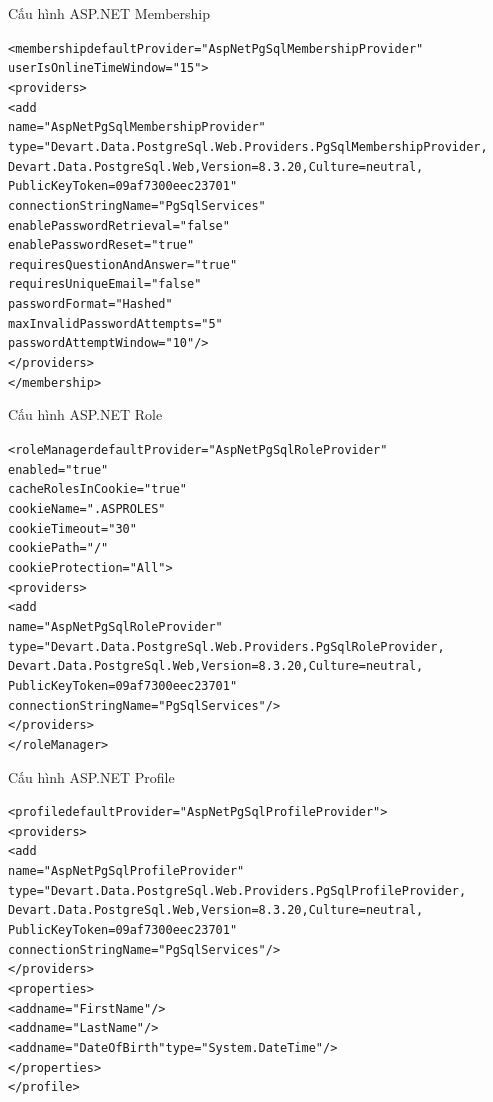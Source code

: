 \documentclass{article}[14pt]
\begin{document}
Cấu hình ASP.NET Membership
\begin{mdframed}[backgroundcolor=white, linecolor=black, roundcorner=5pt]
\begin{alltt}
<membership defaultProvider="AspNetPgSqlMembershipProvider"
            userIsOnlineTimeWindow="15">
  <providers>
    <add
      name="AspNetPgSqlMembershipProvider"
      type="Devart.Data.PostgreSql.Web.Providers.PgSqlMembershipProvider,
            Devart.Data.PostgreSql.Web, Version=8.3.20, Culture=neutral,
            PublicKeyToken=09af7300eec23701"
      connectionStringName="PgSqlServices"
      enablePasswordRetrieval="false"
      enablePasswordReset="true"
      requiresQuestionAndAnswer="true"
      requiresUniqueEmail="false"
      passwordFormat="Hashed"
      maxInvalidPasswordAttempts="5"
      passwordAttemptWindow="10" />
  </providers>
</membership>
\end{alltt}
\end{mdframed}

Cấu hình ASP.NET Role
\begin{mdframed}[backgroundcolor=white, linecolor=black, roundcorner=5pt]
\begin{alltt}
<roleManager defaultProvider="AspNetPgSqlRoleProvider"
             enabled="true"
             cacheRolesInCookie="true"
             cookieName=".ASPROLES"
             cookieTimeout="30"
             cookiePath="/"
             cookieProtection="All">
  <providers>
    <add
      name="AspNetPgSqlRoleProvider"
      type="Devart.Data.PostgreSql.Web.Providers.PgSqlRoleProvider,
            Devart.Data.PostgreSql.Web, Version=8.3.20, Culture=neutral,
            PublicKeyToken=09af7300eec23701"
      connectionStringName="PgSqlServices" />
  </providers>
</roleManager>
\end{alltt}
\end{mdframed}

Cấu hình ASP.NET Profile 
\begin{mdframed}[backgroundcolor=white, linecolor=black, roundcorner=5pt]
\begin{alltt}
<profile defaultProvider="AspNetPgSqlProfileProvider">
  <providers>
    <add
      name="AspNetPgSqlProfileProvider"
      type="Devart.Data.PostgreSql.Web.Providers.PgSqlProfileProvider,
            Devart.Data.PostgreSql.Web, Version=8.3.20, Culture=neutral,
            PublicKeyToken=09af7300eec23701"
      connectionStringName="PgSqlServices" />
  </providers>
  <properties>
    <add name="FirstName" />
    <add name="LastName" />
    <add name="DateOfBirth" type="System.DateTime"/>
  </properties>
</profile>
\end{alltt}
\end{mdframed}
\end{document}
